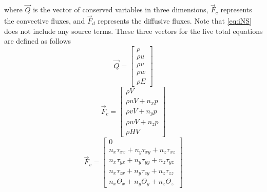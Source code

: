 \noindent
where $\vec{Q}$ is the vector of conserved variables in three dimensions, $\vec{F}_c$ represents the convective fluxes, and $\vec{F}_d$ represents the diffusive fluxes. Note that \cref{eq:iNS} does not include any source terms. These three vectors for the five total equations are defined as follows
%
\begin{equation}
\vec{Q} = \begin{bmatrix} \rho \\
  \rho u \\
  \rho v \\
  \rho w \\
  \rho E \end{bmatrix} \label{eq:iQ}
\end{equation}
%
\begin{equation}
\vec{F}_c = \begin{bmatrix} \rho V \\
  \rho uV + n_x p \\
  \rho vV + n_y p \\
  \rho wV + n_z p \\
  \rho HV \end{bmatrix} \label{eq:iFc}
\end{equation}
%
\begin{equation}
\vec{F}_v = \begin{bmatrix} 0 \\
  n_x\tau_{xx} + n_y\tau_{xy} + n_z\tau_{xz} \\
  n_x\tau_{yx} + n_y\tau_{yy} + n_z\tau_{yz} \\
  n_x\tau_{zx} + n_y\tau_{zy} + n_z\tau_{zz} \\
  n_x\Theta_x + n_y\Theta_y + n_z\Theta_z \end{bmatrix} \label{eq:iFv}
\end{equation}

